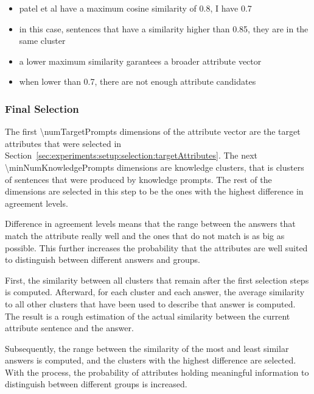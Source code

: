 \begin{itemize}
  \item patel et al have a maximum cosine similarity of 0.8, I have 0.7
  \item in this case, sentences that have a similarity higher than 0.85, they are in the same cluster
  \item a lower maximum similarity garantees a broader attribute vector
  \item when lower than 0.7, there are not enough attribute candidates
\end{itemize}

\subsubsection{Final Selection} %
\label{sec:experiments:setup:selection:finalSelection}
The first \num{\numTargetPrompts} dimensions of the attribute vector are the target attributes that were selected in Section~\ref{sec:experiments:setup:selection:targetAttributes}. The next \num{\minNumKnowledgePrompts} dimensions are knowledge clusters, that is clusters of sentences that were produced by knowledge prompts. The rest of the dimensions are selected in this step to be the ones with the highest difference in agreement levels.

Difference in agreement levels means that the range between the answers that match the attribute really well and the ones that do not match is as big as possible. This further increases the probability that the attributes are well suited to distinguish between different answers and groups.



First, the similarity between all clusters that remain after the first selection steps is computed. Afterward, for each cluster and each answer, the average similarity to all other clusters that have been used to describe that answer is computed. The result is a rough estimation of the actual similarity between the current attribute sentence and the answer.

Subsequently, the range between the similarity of the most and least similar answers is computed, and the clusters with the highest difference are selected. With the process, the probability of attributes holding meaningful information to distinguish between different groups is increased.

